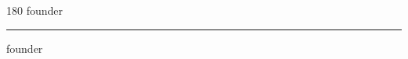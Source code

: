 
\begin{frame}
\begin{center}
\begin{turn}{180}
{\fontsize{2.5cm}{1em}\selectfont founder}
\end{turn}
\vspace{1em}\par  
\hrule
\vspace{1em}\par  
{\fontsize{2.5cm}{1em}\selectfont founder}
\end{center}
\end{frame}
